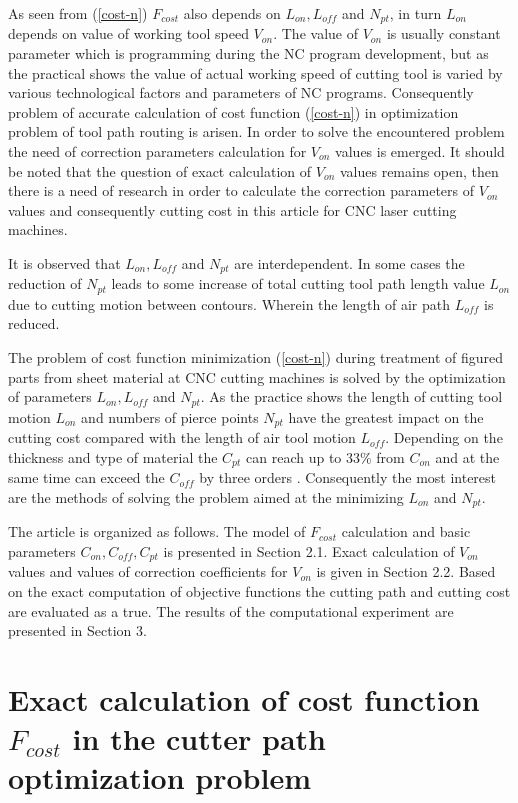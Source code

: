 \documentclass[runningheads]{llncs}
\begin{document}
As seen from (\ref{cost-n})
$F_{cost}$
also depends on
$L_{on}, L_{off}$ and $N_{pt}$,
in turn $L_{on}$ depends on value of working tool speed $V_{on}$.
The value of $V_{on}$ is usually constant parameter
which is programming during the NC program development,
but as the practical shows \cite{ru09,Tavaeva2015Nov}
the value of actual working speed of cutting tool
is varied by various technological factors and parameters of NC programs.
Consequently problem of accurate calculation of cost function (\ref{cost-n})
in optimization problem of tool path routing is arisen.
In order to solve the encountered problem
the need of correction parameters calculation for $V_{on}$
values is emerged.
It should be noted that
the question of exact calculation of  $V_{on}$ values remains open,
then there is a need of research in order to calculate the correction parameters of  $V_{on}$
values and consequently cutting cost in this article for CNC laser cutting machines.

It is observed that $L_{on}, L_{off}$ and $N_{pt}$
are interdependent.
In some cases the reduction of  $N_{pt}$
leads to some increase of total cutting tool path length value $L_{on}$
due to cutting motion between contours.
Wherein the length of air path $L_{off}$ is reduced.

The problem of cost function minimization (\ref{cost-n})
during treatment of figured parts from sheet material
at CNC cutting machines is solved by the optimization of parameters
$L_{on}, L_{off}$ and $N_{pt}$.
As the practice shows the length of cutting tool motion  $L_{on}$
and numbers of pierce points $N_{pt}$
have the greatest impact on the cutting cost compared with the length of air tool motion $L_{off}$.
Depending on the thickness and type of material the $C_{pt}$
can reach up to 33\% from $C_{on}$
and at the same time can exceed the $C_{off}$
by three orders \cite{ru14}.
Consequently the most interest are the methods of solving the problem aimed at the minimizing
$L_{on}$ and $N_{pt}$.

The article is organized as follows.
The model of $F_{cost}$
calculation and basic parameters
$C_{on}, C_{off}, C_{pt}$
is presented in Section 2.1.
Exact calculation of $V_{on}$
values and values of correction coefficients for $V_{on}$
is given in Section 2.2.
Based on the exact computation of objective functions
the cutting path and cutting cost are evaluated as a true.
The results of the computational experiment are presented in Section 3.

\section{Exact calculation of cost function $F_{cost}$ in the cutter path optimization problem}
\end{document}
